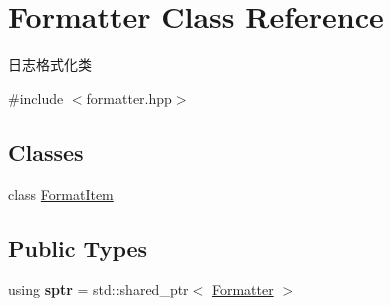 \hypertarget{classFormatter}{}\section{Formatter Class Reference}
\label{classFormatter}


日志格式化类  




{\ttfamily \#include $<$formatter.\+hpp$>$}

\subsection*{Classes}
\begin{DoxyCompactItemize}
\item 
class \hyperlink{classFormatter_1_1FormatItem}{Format\+Item}
\end{DoxyCompactItemize}
\subsection*{Public Types}
\begin{DoxyCompactItemize}
\item 
\mbox{\label{classFormatter_a3febd44eb7c072854de616b59350fe28}} 
using {\bfseries sptr} = std\+::shared\+\_\+ptr$<$ \hyperlink{classFormatter}{Formatter} $>$
\end{DoxyCompactItemize}

